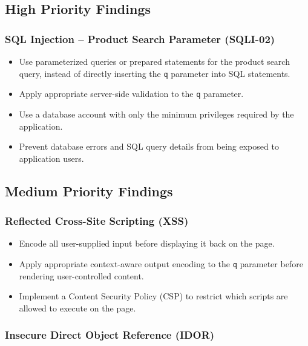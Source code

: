 \subsection*{High Priority Findings}

\subsubsection*{SQL Injection -- Product Search Parameter (SQLI-02)}

\begin{itemize}
    \item Use parameterized queries or prepared statements for the
    product search query, instead of directly inserting the
    \texttt{q} parameter into SQL statements.

    \item Apply appropriate server-side validation to the \texttt{q}
    parameter.

    \item Use a database account with only the minimum privileges
    required by the application.

    \item Prevent database errors and SQL query details from being
    exposed to application users.
\end{itemize}

\subsection*{Medium Priority Findings}

\subsubsection*{Reflected Cross-Site Scripting (XSS)}

\begin{itemize}
    \item Encode all user-supplied input before displaying it back on
    the page.

    \item Apply appropriate context-aware output encoding to the
    \texttt{q} parameter before rendering user-controlled content.

    \item Implement a Content Security Policy (CSP) to restrict which
    scripts are allowed to execute on the page.
\end{itemize}

\subsubsection*{Insecure Direct Object Reference (IDOR)}

